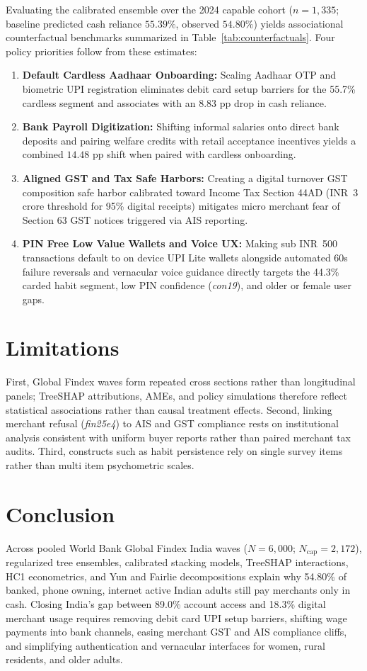 \documentclass[conference]{IEEEtran}
\begin{document}
Evaluating the calibrated ensemble over the 2024 capable cohort ($n = 1,335$; baseline predicted cash reliance $55.39\%$, observed $54.80\%$) yields associational counterfactual benchmarks summarized in Table~\ref{tab:counterfactuals}. Four policy priorities follow from these estimates:
\begin{enumerate}
    \item \textbf{Default Cardless Aadhaar Onboarding:} Scaling Aadhaar OTP and biometric UPI registration eliminates debit card setup barriers for the 55.7\% cardless segment and associates with an $8.83$ pp drop in cash reliance.
    \item \textbf{Bank Payroll Digitization:} Shifting informal salaries onto direct bank deposits and pairing welfare credits with retail acceptance incentives yields a combined $14.48$ pp shift when paired with cardless onboarding.
    \item \textbf{Aligned GST and Tax Safe Harbors:} Creating a digital turnover GST composition safe harbor calibrated toward Income Tax Section 44AD (INR~3 crore threshold for 95\% digital receipts) mitigates micro merchant fear of Section 63 GST notices triggered via AIS reporting.
    \item \textbf{PIN Free Low Value Wallets and Voice UX:} Making sub INR~500 transactions default to on device UPI Lite wallets alongside automated 60s failure reversals and vernacular voice guidance directly targets the 44.3\% carded habit segment, low PIN confidence (\textit{con19}), and older or female user gaps.
\end{enumerate}

\FloatBarrier

\section{Limitations}
First, Global Findex waves form repeated cross sections rather than longitudinal panels; TreeSHAP attributions, AMEs, and policy simulations therefore reflect statistical associations rather than causal treatment effects. Second, linking merchant refusal (\textit{fin25e4}) to AIS and GST compliance rests on institutional analysis consistent with uniform buyer reports rather than paired merchant tax audits. Third, constructs such as habit persistence rely on single survey items rather than multi item psychometric scales.

\section{Conclusion}
Across pooled World Bank Global Findex India waves ($N = 6,000$; $N_{\text{cap}} = 2,172$), regularized tree ensembles, calibrated stacking models, TreeSHAP interactions, HC1 econometrics, and Yun and Fairlie decompositions explain why 54.80\% of banked, phone owning, internet active Indian adults still pay merchants only in cash. Closing India's gap between 89.0\% account access and 18.3\% digital merchant usage requires removing debit card UPI setup barriers, shifting wage payments into bank channels, easing merchant GST and AIS compliance cliffs, and simplifying authentication and vernacular interfaces for women, rural residents, and older adults.
\end{document}
